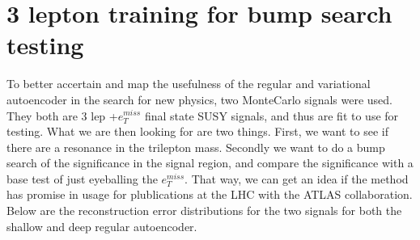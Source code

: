 
\section{3 lepton training for bump search testing}

To better accertain and map the usefulness of the regular and variational autoencoder in the search for 
new physics, two MonteCarlo signals were used. They both are 3 lep +$e_T^{miss}$ final state SUSY signals,
and thus are fit to use for testing. What we are then looking for are two things. First, we want to see if
there are a resonance in the trilepton mass. Secondly we want to do a bump search of the significance 
in the signal region, and compare the significance with a base test of just eyeballing the $e_T^{miss}$. 
That way, we can get an idea if the method has promise in usage for plublications at the LHC with the ATLAS collaboration. 
Below are the reconstruction error distributions for the two signals for both the shallow and deep 
regular autoencoder.

